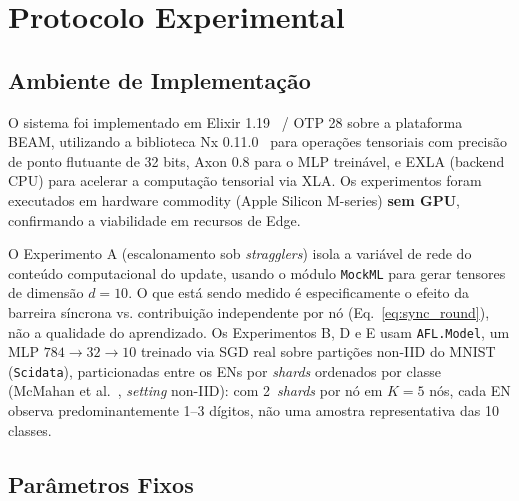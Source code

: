 \documentclass[conference,a4paper]{IEEEtran}
\begin{document}
\section{Protocolo Experimental}
\label{sec:exp}

\subsection{Ambiente de Implementação}

O sistema foi implementado em Elixir 1.19~\cite{elixir2024} / OTP 28 sobre
a plataforma BEAM, utilizando a biblioteca Nx 0.11.0~\cite{nx2024} para
operações tensoriais com
precisão de ponto flutuante de 32 bits, Axon 0.8 para o MLP treinável, e
EXLA (backend CPU) para acelerar a computação tensorial via XLA. Os
experimentos foram executados em hardware commodity (Apple Silicon
M-series) \textbf{sem GPU}, confirmando a viabilidade em recursos de Edge.

O Experimento A (escalonamento sob \textit{stragglers}) isola a variável de
rede do conteúdo computacional do update, usando o módulo \texttt{MockML}
para gerar tensores de dimensão $d=10$. O que está sendo medido é
especificamente o efeito da barreira síncrona vs. contribuição independente
por nó (Eq.~\ref{eq:sync_round}), não a qualidade do aprendizado. Os
Experimentos B, D e E usam \texttt{AFL.Model}, um MLP $784\!\to\!32\!\to\!10$
treinado via SGD real sobre partições non-IID do MNIST (\texttt{Scidata}),
particionadas entre os ENs por \textit{shards} ordenados por classe
(McMahan et al.~\cite{mcmahan2017}, \textit{setting} non-IID): com
2~\textit{shards} por nó em $K=5$ nós, cada EN observa predominantemente
1--3 dígitos, não uma amostra representativa das 10 classes.

\subsection{Parâmetros Fixos}
\end{document}
